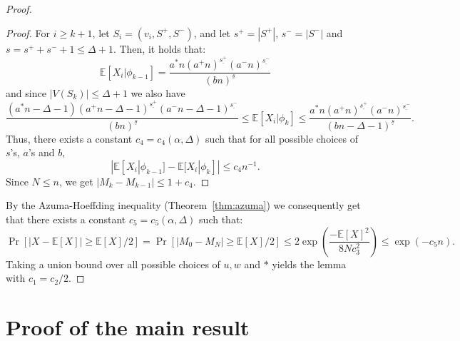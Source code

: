 \documentclass[10pt, a4paper]{article}
\theoremstyle{remark}
\newcommand*{\E}{\ensuremath{\mathbb{E}}}
\begin{document}
\begin{proof}
\begin{proof}
        For $i \geq k+1$, let $S_i = (v_i, S^+, S^-)$, and let $ s^+ = |S^+|$, $ s^-=|S^-|$ and $s = s^+ + s^- + 1 \leq \Delta + 1$. 
        Then, it holds that:
        \[\E[X_i | \phi_{k-1}] = \frac{a^*n (a^+n)^{\underline{s^+}}(a^-n)^{\underline{s^-}}}{(b n)^{\underline{s}}} \]
        and since $|V(S_k)| \leq \Delta + 1$ we also have
        \[\frac{(a^*n - \Delta - 1)(a^+n- \Delta - 1)^{\underline{s^+}}(a^-n- \Delta - 1)^{\underline{s^-}}}{(b n)^{\underline{s}}} \leq \E[X_i | \phi_{k}] \leq \frac{a^*n (a^+n)^{\underline{s^+}}(a^-n)^{\underline{s^-}}}{(b n - \Delta - 1)^{\underline{s}}}.\]
        Thus, there exists a constant $c_4 = c_4(\alpha, \Delta)$ such that for all possible choices of $s$'s, $a$'s and $b$,
        \[|\E[X_i | \phi_{k-1}] - \E[X_i| \phi_{k}]| \leq c_4n^{-1}. \]
        Since $N \leq n$, we get $|M_{k} - M_{k-1}| \leq  1 + c_4$.
    \end{proof}
    \vspace{10pt}

    By the Azuma-Hoeffding inequality (Theorem~\ref{thm:azuma}) we consequently get that there exists a constant $c_5 = c_5(\alpha, \Delta)$ such that:
    \[ \Pr[|X - \E[X]| \geq \E[X]/2] = \Pr[|M_0 - M_N| \geq \E[X]/2] \leq 2 \exp(\frac{-\E[X]^2}{8N c_3^2}) \leq  \exp(-c_5n).\]
    Taking a union bound over all possible choices of $u, w$ and $*$ yields the lemma with $c_1 = c_2/2$. 
\end{proof}

\section{Proof of the main result}
\label{section:proofofmain}
\end{document}
